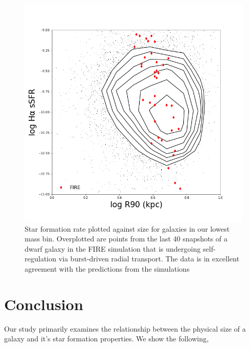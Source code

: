 \documentclass[iop]{emulateapj}
\begin{document}
\begin{figure}
	\centering
	\includegraphics[width=1.5 \columnwidth]{111_dwarf_85_size_SF_r.png}
	\caption{Star formation rate plotted against size for galaxies in our lowest mass bin. Overplotted are points from the last 40 snapshots of a dwarf galaxy in the FIRE simulation that is undergoing self-regulation via burst-driven radial transport. The data is in excellent agreement with the predictions from the simulations}
	\label{fig:predict}
	
\end{figure}

\section{Conclusion}

Our study primarily examines the relationship between the physical size of a galaxy and it's star formation properties. We show the following,
\end{document}
